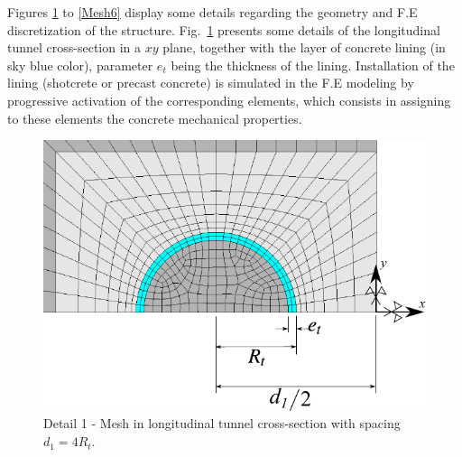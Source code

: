 \documentclass[a4paper,fleqn]{cas-sc}
\begin{document}
Figures \ref{Mesh2} to \ref{Mesh6} display some details regarding the geometry and F.E discretization of the structure. Fig.~\ref{Mesh2} presents some details of the longitudinal tunnel cross-section in a $xy$ plane, together with the layer of concrete lining (in sky blue color), parameter $e_t$ being the thickness of the lining. Installation of the lining (shotcrete or precast concrete) is simulated in the F.E modeling by progressive activation of the corresponding elements, which consists in assigning to these elements the concrete mechanical properties.
\begin{figure}[h!]
	\centering
	\includegraphics[scale=0.8]{Mesh2.pdf}
	\caption{Detail 1 - Mesh in longitudinal tunnel cross-section with spacing $d_1=4R_t$.}
	\label{Mesh2}
\end{figure}
\FloatBarrier
\end{document}
